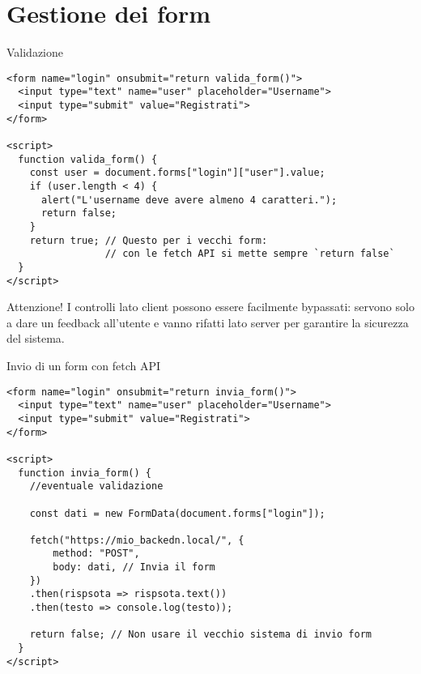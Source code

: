 \section[Form]{Gestione dei form}

\begin{frame}[fragile]{Validazione}\transfade\centering
  \begin{verbatim}
<form name="login" onsubmit="return valida_form()">
  <input type="text" name="user" placeholder="Username">
  <input type="submit" value="Registrati">
</form>

<script>
  function valida_form() {
    const user = document.forms["login"]["user"].value;
    if (user.length < 4) {
      alert("L'username deve avere almeno 4 caratteri.");
      return false;
    }
    return true; // Questo per i vecchi form:
                 // con le fetch API si mette sempre `return false`
  }
</script>
  \end{verbatim}
  \pause\par
  \alert{Attenzione!} I controlli lato client possono essere facilmente bypassati: servono solo a dare un feedback all'utente e vanno rifatti lato server per garantire la sicurezza del sistema.\\
\end{frame}

\begin{frame}[fragile]{Invio di un form con fetch API}\transfade\centering
  \begin{verbatim}
<form name="login" onsubmit="return invia_form()">
  <input type="text" name="user" placeholder="Username">
  <input type="submit" value="Registrati">
</form>

<script>
  function invia_form() {
    //eventuale validazione

    const dati = new FormData(document.forms["login"]);

    fetch("https://mio_backedn.local/", {
        method: "POST",
        body: dati, // Invia il form
    })
    .then(rispsota => rispsota.text())
    .then(testo => console.log(testo));

    return false; // Non usare il vecchio sistema di invio form
  }
</script>
  \end{verbatim}
\end{frame}

